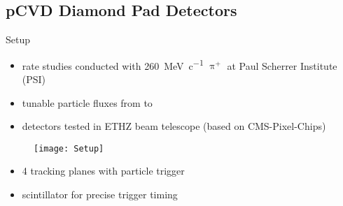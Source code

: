 \subsection{pCVD Diamond Pad Detectors}
\begin{frame}{Setup}
	
	\begin{itemize}
		\itemfill
		\item rate studies conducted with \SI{260}{\mega\electronvolt\per c} $\uppi^+$ at Paul Scherrer Institute (PSI)
		\item tunable particle fluxes from  to 
		\item detectors tested in ETHZ beam telescope (based on CMS-Pixel-Chips)
	\end{itemize}

	\vspace*{-5pt}
	\begin{figure}[h] 
		\centering
		\texttt{[image: Setup]}
	\end{figure}
	\vspace*{-5pt}
	
	\begin{itemize}
		\item 4 tracking planes with particle trigger
		\item scintillator for precise trigger timing \ra {}
	\end{itemize}

\end{frame}

